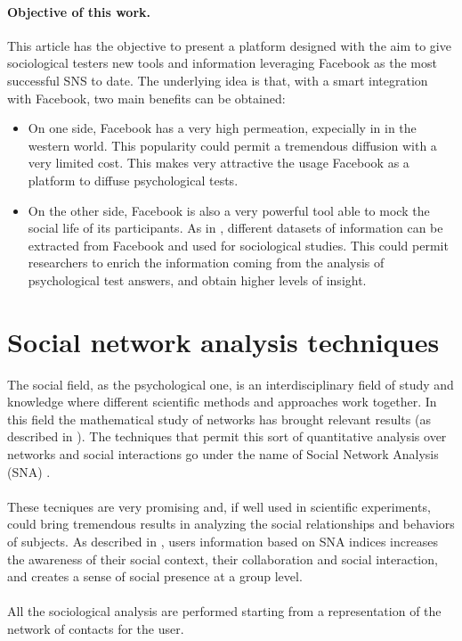 \paragraph{Objective of this work.}
This article has the objective to present a platform designed with the aim to give sociological testers new tools and
information leveraging Facebook as the most successful SNS to date.
The underlying idea is that, with a smart integration with Facebook, two main benefits can be obtained:

\begin{itemize}
\item On one side, Facebook has a very high permeation, expecially in in the western world.
This popularity could permit a tremendous diffusion with a very limited cost.
This makes very attractive the usage Facebook as a platform to diffuse psychological tests.
\item On the other side, Facebook is also a very powerful tool able to mock the social life of its participants.
As in \cite{Lewis-2008}, different datasets of information can be extracted from Facebook and used for sociological studies.
This could permit researchers to enrich the information coming from the analysis of psychological test answers, and obtain higher levels of insight.
\end{itemize}

\label{sec:sna}
\section{Social network analysis techniques}
The social field, as the psychological one, is an interdisciplinary field of study and knowledge where different scientific methods and approaches work together.
In this field the mathematical study of networks has brought relevant results (as described in \cite{Wassermann-1994}).
The techniques that permit this sort of quantitative analysis over networks and social interactions go under the name of Social Network Analysis (SNA) \cite{Butts-2005}.\\
\\
These tecniques are very promising and, if well used in scientific experiments, could bring tremendous results in analyzing the social relationships and behaviors
of subjects.
As described in \cite{Martino-2007}, users information based on SNA indices increases the awareness of their social context, their collaboration and social interaction,
and creates a sense of social presence at a group level.\\
\\
All the sociological analysis are performed starting from a representation of the network of contacts for the user.

